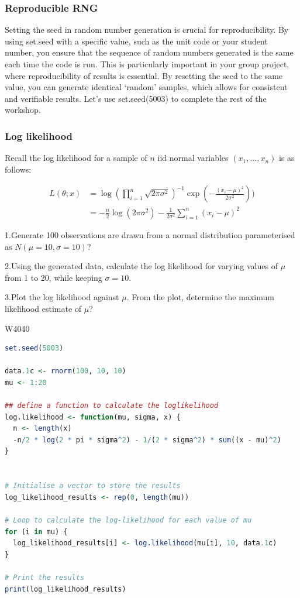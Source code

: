 \subsubsection{Reproducible RNG}

\indent 

Setting the seed in random number generation is crucial for reproducibility. By using set.seed with a specific value, such as the unit code or your student number, you ensure that the sequence of random numbers generated is the same each time the code is run. This is particularly important in your group project, where reproducibility of results is essential. By resetting the seed to the same value, you can generate identical ‘random’ samples, which allows for consistent and verifiable results. Let’s use set.seed(5003) to complete the rest of the workshop.

\subsubsection{Log likelihood}

\indent 

Recall the log likelihood for a sample of $n$ iid normal variables $(x_1,...,x_n)$ is as follows:

\begin{align*}
    L(\theta;x) & = \log(\prod_{i=1}^{n}\sqrt{2\pi\sigma^2})^{-1}\exp(-\frac{(x_i-\mu)^2}{2\sigma^2}))\\
    & = -\frac{n}{2}\log(2\pi\sigma^2)-\frac{1}{2\sigma^2}\sum_{i=1}^{n}(x_i-\mu)^2
\end{align*}

1.Generate 100 observations are drawn from a normal distribution parameterised as $N(\mu=10,\sigma=10)$?

2.Using the generated data, calculate the log likelihood for varying values of $\mu$ from 1 to 20, while keeping $\sigma=10$.

3.Plot the log likelihood against $\mu$. From the plot, determine the maximum likelihood estimate of $\mu$?


\begin{ocg}{}{W404}{0}
\begin{lstlisting}[language = R]
set.seed(5003)

data.1c <- rnorm(100, 10, 10)
mu <- 1:20

## define a function to calculate the loglikelihood 
log.likelihood <- function(mu, sigma, x) {
  n <- length(x)
  -n/2 * log(2 * pi * sigma^2) - 1/(2 * sigma^2) * sum((x - mu)^2)
}


# Initialise a vector to store the results
log_likelihood_results <- rep(0, length(mu))

# Loop to calculate the log-likelihood for each value of mu
for (i in mu) {
  log_likelihood_results[i] <- log.likelihood(mu[i], 10, data.1c)
}

# Print the results
print(log_likelihood_results)
\end{lstlisting}
\end{ocg}

